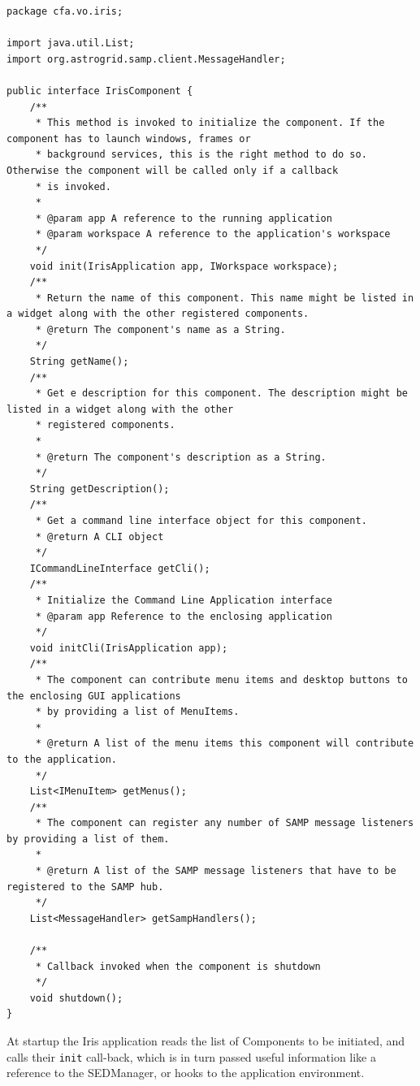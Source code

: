 \documentclass[final,5p]{elsarticle}
\begin{document}
\begin{lstlisting}[style=java,
	caption={This snippet of code represents the main interface that all components in Iris have to implement, and how dependencies get injected into the components at runtime.},
	label=lst:component]
package cfa.vo.iris;

import java.util.List;
import org.astrogrid.samp.client.MessageHandler;

public interface IrisComponent {
    /**
     * This method is invoked to initialize the component. If the component has to launch windows, frames or
     * background services, this is the right method to do so. Otherwise the component will be called only if a callback
     * is invoked.
     *
     * @param app A reference to the running application
     * @param workspace A reference to the application's workspace
     */
    void init(IrisApplication app, IWorkspace workspace);
    /**
     * Return the name of this component. This name might be listed in a widget along with the other registered components.
     * @return The component's name as a String.
     */
    String getName();
    /**
     * Get e description for this component. The description might be listed in a widget along with the other
     * registered components.
     *
     * @return The component's description as a String.
     */
    String getDescription();
    /**
     * Get a command line interface object for this component.
     * @return A CLI object
     */
    ICommandLineInterface getCli();
    /**
     * Initialize the Command Line Application interface
     * @param app Reference to the enclosing application
     */
    void initCli(IrisApplication app);
    /**
     * The component can contribute menu items and desktop buttons to the enclosing GUI applications
     * by providing a list of MenuItems.
     *
     * @return A list of the menu items this component will contribute to the application.
     */
    List<IMenuItem> getMenus();
    /**
     * The component can register any number of SAMP message listeners by providing a list of them.
     *
     * @return A list of the SAMP message listeners that have to be registered to the SAMP hub.
     */
    List<MessageHandler> getSampHandlers();

    /**
     * Callback invoked when the component is shutdown
     */
    void shutdown();
}
\end{lstlisting}

At startup the Iris application reads the list of Components to be initiated, and calls their \verb|init| call-back, which is in turn passed useful information like a reference to the SEDManager, or hooks to the application environment.
\end{document}
